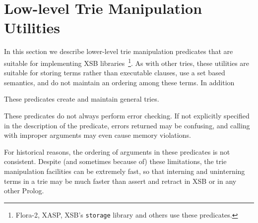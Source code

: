 \section{Low-level Trie Manipulation Utilities}

In this section we describe lower-level trie manipulation predicates
that are suitable for implementing XSB libraries~\footnote{Flora-2,
  XASP, XSB's {\tt storage} library and others use these predicates.}.
As with other tries, these utilities are suitable for storing terms
rather than executable clauses, use a set based semantics, and do not
maintain an ordering among these terms.  In addition
%
\bi
\item These predicates create and maintain
  general tries.
%
\item These predicates do not always perform error checking.  If not
  explicitly specified in the description of the predicate, errors
  returned may be confusing, and calling with improper arguments may
  even cause memory violations.  
%
\item For historical reasons, the ordering of arguments in these
  predicates is not consistent.
\ei
%
Despite (and sometimes because of) these limitations, the trie
manipulation facilities can be extremely fast, so that interning and
uninterning terms in a trie may be much faster than assert and retract
in XSB or in any other Prolog.

